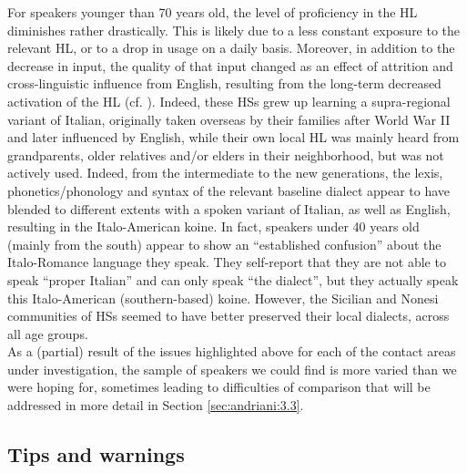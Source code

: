\documentclass[output=paper,hidelinks]{langscibook}
\begin{document}
For speakers younger than 70 years old, the level of proficiency in the HL diminishes rather drastically. This is likely due to a less constant exposure to the relevant HL, or to a drop in usage on a daily basis. Moreover, in addition to the decrease in input, the quality of that input changed as an effect of attrition and cross-linguistic influence from English, resulting from the long-term decreased activation of the HL (cf. \citealt{PascualyCabo2013}). Indeed, these HSs grew up learning a supra-regional variant of Italian, originally taken overseas by their families after World War II and later influenced by English, while their own local HL was mainly heard from grandparents, older relatives and/or elders in their neighborhood, but was not actively used. Indeed, from the intermediate to the new generations, the lexis, phonetics/phonology and syntax of the relevant baseline dialect appear to have blended to different extents with a spoken variant of Italian, as well as English, resulting in the Italo-American koine. In fact, speakers under 40 years old (mainly from the south) appear to show an ``established confusion'' about the Italo-Romance language they speak. They self-report that they are not able to speak ``proper Italian'' and can only speak ``the dialect'', but they actually speak this Italo-American (southern-based) koine. However, the Sicilian and Nonesi communities of HSs seemed to have better preserved their local dialects, across all age groups.\\
\linebreak
\noindent As a (partial) result of the issues highlighted above for each of the contact areas under investigation, the sample of speakers we could find is more varied than we were hoping for, sometimes leading to difficulties of comparison that will be addressed in more detail in Section \ref{sec:andriani:3.3}.

\subsection{Tips and warnings}
\end{document}
